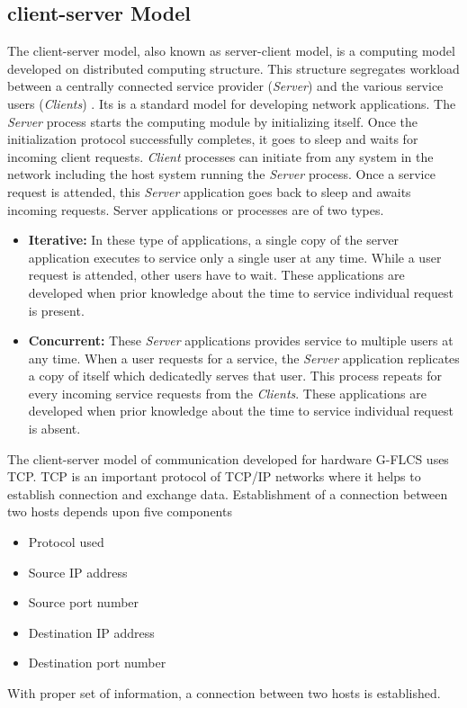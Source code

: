 \subsection{client\hyp{}server Model}
The client\hyp{}server model, also known as server\hyp{}client model, is a computing model developed on distributed computing structure. This structure segregates workload between a centrally connected service provider (\textit{Server}) and the various service users (\textit{Clients}) \cite{Simon2006}. Its is a standard model for developing network applications. The \textit{Server} process starts the computing module by initializing itself. Once the initialization protocol successfully completes, it goes to sleep and waits for incoming client requests. \textit{Client} processes can initiate from any system in the network including the host system running the \textit{Server} process. Once a service request is attended, this \textit{Server} application goes back to sleep and awaits incoming requests. 
Server applications or processes are of two types.
\begin{itemize}
	\item \textbf{Iterative:} In these type of applications, a single copy of the server application executes to service only a single user at any time. While a user request is attended, other users have to wait. These applications are developed when prior knowledge about the time to service individual request is present. 
	\item \textbf{Concurrent:} These \textit{Server} applications provides service to multiple users at any time. When a user requests for a service, the \textit{Server} application replicates a copy of itself which dedicatedly serves that user. This process repeats for every incoming service requests from the \textit{Clients}. These applications are developed when prior knowledge about the time to service individual request is absent.	
\end{itemize}
The client\hyp{}server model of communication developed for hardware G-FLCS uses TCP. TCP is an important protocol of TCP/IP networks where it helps to establish connection and exchange data. Establishment of a connection between two hosts depends upon five components
\begin{itemize}
	\item Protocol used
	\item Source IP address
	\item Source port number
	\item Destination IP address
	\item Destination port number 
\end{itemize}
With proper set of information, a connection between two hosts is established.


